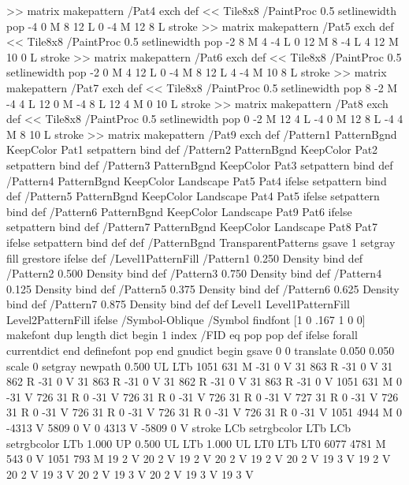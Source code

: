 {{{>> matrix makepattern
/Pat4 exch def
<< Tile8x8
 /PaintProc {0.5 setlinewidth pop -4 0 M 8 12 L
	0 -4 M 12 8 L stroke}
>> matrix makepattern
/Pat5 exch def
<< Tile8x8
 /PaintProc {0.5 setlinewidth pop -2 8 M 4 -4 L
	0 12 M 8 -4 L 4 12 M 10 0 L stroke}
>> matrix makepattern
/Pat6 exch def
<< Tile8x8
 /PaintProc {0.5 setlinewidth pop -2 0 M 4 12 L
	0 -4 M 8 12 L 4 -4 M 10 8 L stroke}
>> matrix makepattern
/Pat7 exch def
<< Tile8x8
 /PaintProc {0.5 setlinewidth pop 8 -2 M -4 4 L
	12 0 M -4 8 L 12 4 M 0 10 L stroke}
>> matrix makepattern
/Pat8 exch def
<< Tile8x8
 /PaintProc {0.5 setlinewidth pop 0 -2 M 12 4 L
	-4 0 M 12 8 L -4 4 M 8 10 L stroke}
>> matrix makepattern
/Pat9 exch def
/Pattern1 {PatternBgnd KeepColor Pat1 setpattern} bind def
/Pattern2 {PatternBgnd KeepColor Pat2 setpattern} bind def
/Pattern3 {PatternBgnd KeepColor Pat3 setpattern} bind def
/Pattern4 {PatternBgnd KeepColor Landscape {Pat5} {Pat4} ifelse setpattern} bind def
/Pattern5 {PatternBgnd KeepColor Landscape {Pat4} {Pat5} ifelse setpattern} bind def
/Pattern6 {PatternBgnd KeepColor Landscape {Pat9} {Pat6} ifelse setpattern} bind def
/Pattern7 {PatternBgnd KeepColor Landscape {Pat8} {Pat7} ifelse setpattern} bind def
} def
%
%
%
/PatternBgnd {
  TransparentPatterns {} {gsave 1 setgray fill grestore} ifelse
} def
%
%
/Level1PatternFill {
/Pattern1 {0.250 Density} bind def
/Pattern2 {0.500 Density} bind def
/Pattern3 {0.750 Density} bind def
/Pattern4 {0.125 Density} bind def
/Pattern5 {0.375 Density} bind def
/Pattern6 {0.625 Density} bind def
/Pattern7 {0.875 Density} bind def
} def
%
%
Level1 {Level1PatternFill} {Level2PatternFill} ifelse
%
/Symbol-Oblique /Symbol findfont [1 0 .167 1 0 0] makefont
dup length dict begin {1 index /FID eq {pop pop} {def} ifelse} forall
currentdict end definefont pop
end
gnudict begin
gsave
0 0 translate
0.050 0.050 scale
0 setgray
newpath
0.500 UL
LTb
1051 631 M
-31 0 V
31 863 R
-31 0 V
31 862 R
-31 0 V
31 863 R
-31 0 V
31 862 R
-31 0 V
31 863 R
-31 0 V
1051 631 M
0 -31 V
726 31 R
0 -31 V
726 31 R
0 -31 V
726 31 R
0 -31 V
727 31 R
0 -31 V
726 31 R
0 -31 V
726 31 R
0 -31 V
726 31 R
0 -31 V
726 31 R
0 -31 V
1051 4944 M
0 -4313 V
5809 0 V
0 4313 V
-5809 0 V
stroke
LCb setrgbcolor
LTb
LCb setrgbcolor
LTb
1.000 UP
0.500 UL
LTb
1.000 UL
LT0
LTb
LT0
6077 4781 M
543 0 V
1051 793 M
19 2 V
20 2 V
19 2 V
20 2 V
19 2 V
20 2 V
19 3 V
19 2 V
20 2 V
19 3 V
20 2 V
19 3 V
20 2 V
19 3 V
19 3 V
}}
